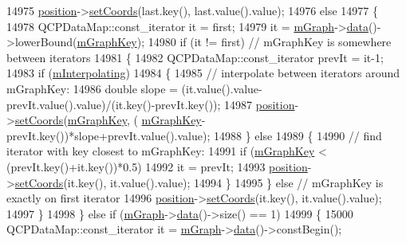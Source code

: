 \begin{DoxyCode}
14975           \hyperlink{a00042_a69917e2fdb2b3a929c196958feee7cbe}{position}->\hyperlink{a00038_aa988ba4e87ab684c9021017dcaba945f}{setCoords}(last.key(), last.value().value);
14976         \textcolor{keywordflow}{else}
14977         \{
14978           QCPDataMap::const\_iterator it = first;
14979           it = \hyperlink{a00042_a2d70cf616b579563aa15f796dfc143ac}{mGraph}->\hyperlink{a00031_a8f4c17d993df4759c7426db45b33fbc0}{data}()->lowerBound(\hyperlink{a00042_a8fa20f2e9ee07d21fd7c8d30ba4702ca}{mGraphKey});
14980           \textcolor{keywordflow}{if} (it != first) \textcolor{comment}{// mGraphKey is somewhere between iterators}
14981           \{
14982             QCPDataMap::const\_iterator prevIt = it-1;
14983             \textcolor{keywordflow}{if} (\hyperlink{a00042_afab37c22ad39f235921e86f93cd84595}{mInterpolating})
14984             \{
14985               \textcolor{comment}{// interpolate between iterators around mGraphKey:}
14986               \textcolor{keywordtype}{double} slope = (it.value().value-prevIt.value().value)/(it.key()-prevIt.key());
14987               \hyperlink{a00042_a69917e2fdb2b3a929c196958feee7cbe}{position}->\hyperlink{a00038_aa988ba4e87ab684c9021017dcaba945f}{setCoords}(\hyperlink{a00042_a8fa20f2e9ee07d21fd7c8d30ba4702ca}{mGraphKey}, (
      \hyperlink{a00042_a8fa20f2e9ee07d21fd7c8d30ba4702ca}{mGraphKey}-prevIt.key())*slope+prevIt.value().value);
14988             \} \textcolor{keywordflow}{else}
14989             \{
14990               \textcolor{comment}{// find iterator with key closest to mGraphKey:}
14991               \textcolor{keywordflow}{if} (\hyperlink{a00042_a8fa20f2e9ee07d21fd7c8d30ba4702ca}{mGraphKey} < (prevIt.key()+it.key())*0.5)
14992                 it = prevIt;
14993               \hyperlink{a00042_a69917e2fdb2b3a929c196958feee7cbe}{position}->\hyperlink{a00038_aa988ba4e87ab684c9021017dcaba945f}{setCoords}(it.key(), it.value().value);
14994             \}
14995           \} \textcolor{keywordflow}{else} \textcolor{comment}{// mGraphKey is exactly on first iterator}
14996             \hyperlink{a00042_a69917e2fdb2b3a929c196958feee7cbe}{position}->\hyperlink{a00038_aa988ba4e87ab684c9021017dcaba945f}{setCoords}(it.key(), it.value().value);
14997         \}
14998       \} \textcolor{keywordflow}{else} \textcolor{keywordflow}{if} (\hyperlink{a00042_a2d70cf616b579563aa15f796dfc143ac}{mGraph}->\hyperlink{a00031_a8f4c17d993df4759c7426db45b33fbc0}{data}()->size() == 1)
14999       \{
15000         QCPDataMap::const\_iterator it = \hyperlink{a00042_a2d70cf616b579563aa15f796dfc143ac}{mGraph}->\hyperlink{a00031_a8f4c17d993df4759c7426db45b33fbc0}{data}()->constBegin();

\end{DoxyCode}
